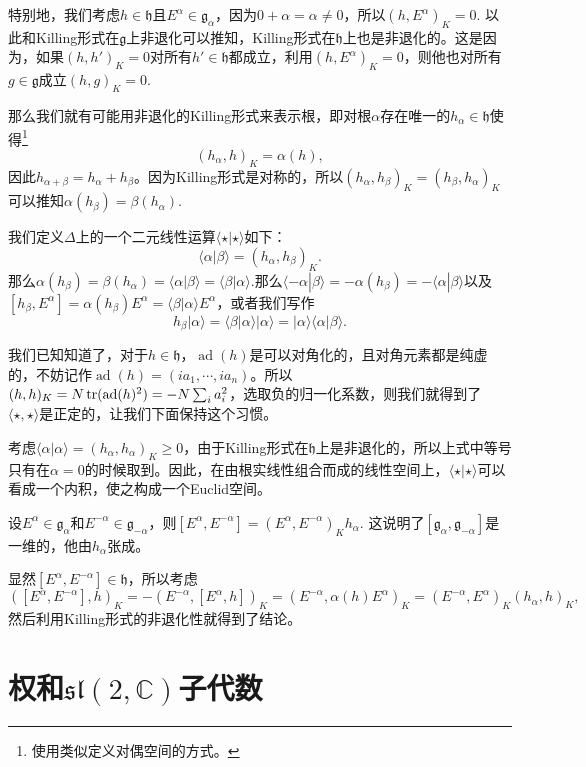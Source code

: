 \documentclass[11pt]{article}
\theoremstyle{definition}
\theoremstyle{plain}
\newcommand{\cc}{\mathbb{C}}
\newcommand{\lag}{{\mathfrak{g}}}
\DeclareMathOperator{\ad}{ad}
\begin{document}
\para 特别地，我们考虑$h\in \mathfrak{h}$且$E^\alpha\in \lag_\alpha$，因为$0+\alpha=\alpha\neq 0$，所以$(h,E^\alpha)_K=0$. 以此和Killing形式在$\mathfrak{g}$上非退化可以推知，Killing形式在$\mathfrak{h}$上也是非退化的。这是因为，如果$(h,h')_K=0$对所有$h'\in \mathfrak{h}$都成立，利用$(h,E^\alpha)_K=0$，则他也对所有$g\in \lag$成立$(h,g)_K=0$.

那么我们就有可能用非退化的Killing形式来表示根，即对根$\alpha$存在唯一的$h_\alpha\in\mathfrak{h}$使得\footnote{使用类似定义对偶空间的方式。}
\[
	(h_\alpha,h)_K=\alpha(h),
\]
因此$h_{\alpha+\beta}=h_\alpha+h_\beta$。因为Killing形式是对称的，所以$(h_\alpha,h_\beta)_K=(h_\beta,h_\alpha)_K$可以推知$\alpha(h_\beta)=\beta(h_\alpha)$.

\para 我们定义$\Delta$上的一个二元线性运算$\langle \star|\star \rangle$如下：
\[
	\langle \alpha|\beta \rangle=(h_\alpha,h_\beta)_K.
\]
那么$\alpha(h_\beta)=\beta(h_\alpha)=\langle \alpha|\beta \rangle=\langle \beta|\alpha \rangle$.那么$\langle -\alpha|\beta \rangle=-\alpha(h_\beta)=-\langle \alpha|\beta \rangle$以及$[h_\beta,E^\alpha]=\alpha(h_\beta)E^\alpha=\langle \beta|\alpha \rangle E^\alpha$，或者我们写作
\[
	h_\beta|\alpha\rangle = \langle \beta|\alpha \rangle|\alpha\rangle=|\alpha\rangle \langle \alpha|\beta \rangle.
\]

\para 我们已知知道了，对于$h\in \mathfrak{h}$，$\ad(h)$是可以对角化的，且对角元素都是纯虚的，不妨记作$\ad(h)=(ia_1,\cdots,ia_n)$。所以$(h,h)_K=N\tr(\ad(h)^2)=-N\sum_i a_i^2$，选取负的归一化系数，则我们就得到了$\langle \star,\star \rangle$是正定的，让我们下面保持这个习惯。

考虑$\langle \alpha|\alpha\rangle = (h_\alpha,h_\alpha)_K\geq 0$，由于Killing形式在$\mathfrak{h}$上是非退化的，所以上式中等号只有在$\alpha=0$的时候取到。因此，在由根实线性组合而成的线性空间上，$\langle \star|\star\rangle$可以看成一个内积，使之构成一个Euclid空间。

{\pro 设$E^\alpha \in \lag_\alpha$和$E^{-\alpha} \in \lag_{-\alpha}$，则$[E^{\alpha},E^{-\alpha}]=(E^{\alpha},E^{-\alpha})_Kh_\alpha$. 这说明了$[\lag_{\alpha},\lag_{-\alpha}]$是一维的，他由$h_\alpha$张成。\endpro}

\proof 显然$[E^\alpha,E^{-\alpha}]\in \mathfrak{h}$，所以考虑
\[
	([E^\alpha,E^{-\alpha}],h)_K=-(E^{-\alpha},[E^\alpha,h])_K=(E^{-\alpha},\alpha(h)E^\alpha)_K=(E^{-\alpha},E^\alpha)_K(h_\alpha,h)_K,
\]
然后利用Killing形式的非退化性就得到了结论。\endproof

\section{权和$\mathfrak{sl}(2,\cc)$子代数}
\end{document}
